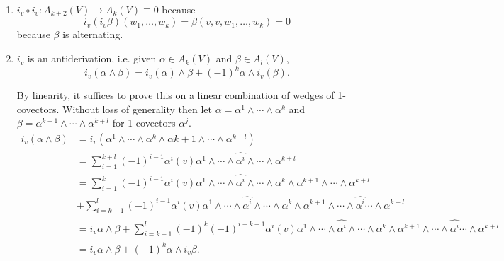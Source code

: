 \begin{prop}
  \begin{enumerate}
    \item{
      $i_v \circ i_v : A_{k+2}(V) \to A_k(V) \equiv 0$
      because
      $$
        i_v(i_v\beta)
          (w_1, \dots, w_k)
      = \beta(v, v, w_1, \dots, w_k)
      = 0
      $$
      because $\beta$ is alternating.
    }
    \item{
      $i_v$ is an antiderivation, i.e. given $\alpha \in A_k(V)$ and
      $\beta \in A_l(V)$,
      $$
        i_v(\alpha \wedge \beta)
      = i_v(\alpha) \wedge \beta + (-1)^k \alpha \wedge i_v(\beta).
      $$

      By linearity, it suffices to prove this on a linear combination
      of wedges of 1-covectors. Without loss of generality then let
      $\alpha = \alpha^1 \wedge \cdots \wedge \alpha^k$ and
      $\beta = \alpha^{k+1} \wedge \cdots \wedge \alpha^{k+l}$ for
      1-covectors $\alpha^j$.
      \begin{align*}
         i_v(\alpha \wedge \beta)
      &= i_v(\alpha^1 \wedge \cdots \wedge \alpha^k \wedge
             \alpha{k+1} \wedge \cdots \wedge \alpha^{k+l}) \\
      &= \sum_{i=1}^{k+l}
           (-1)^{i-1}
           \alpha^i(v)
           \alpha^1 \wedge
           \cdots \wedge
           \hat{\alpha^i} \wedge
           \cdots \wedge
           \alpha^{k+l} \\
      &= \sum_{i=1}^{k}
           (-1)^{i-1}
           \alpha^i(v)
           \alpha^1 \wedge
           \cdots \wedge
           \hat{\alpha^i} \wedge
           \cdots \wedge
           \alpha^{k} \wedge
           \alpha^{k+1} \wedge
           \cdots \wedge
           \alpha^{k+l} \\
      &+ \sum_{i=k+1}^{l}
           (-1)^{i-1}
           \alpha^i(v)
           \alpha^1 \wedge
           \cdots \wedge
           \hat{\alpha^i} \wedge
           \cdots \wedge
           \alpha^{k} \wedge
           \alpha^{k+1} \wedge
           \cdots \wedge
           \hat{\alpha^i}
           \cdots \wedge
           \alpha^{k+l} \\
      &= i_v \alpha \wedge \beta
       + \sum_{i=k+1}^l
           (-1)^k
           (-1)^{i-k-1}
           \alpha^i(v)
           \alpha^1 \wedge
           \cdots \wedge
           \hat{\alpha^i} \wedge
           \cdots \wedge
           \alpha^{k} \wedge
           \alpha^{k+1} \wedge
           \cdots \wedge
           \hat{\alpha^i}
           \cdots \wedge
           \alpha^{k+l} \\
      &= i_v \alpha \wedge \beta
       + (-1)^k \alpha \wedge i_v\beta.
      \end{align*}
    }
  \end{enumerate}
\end{prop}

